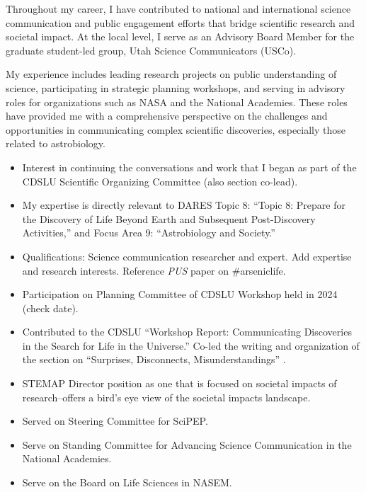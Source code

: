 \documentclass[12pt]{article}
\begin{document}
\vspace{1em}

Throughout my career, I have contributed to national and international science communication and public engagement efforts that bridge scientific research and societal impact. At the local level, I serve as an Advisory Board Member for the graduate student-led group, Utah Science Communicators (USCo).

My experience includes leading research projects on public understanding of science, participating in strategic planning workshops, and serving in advisory roles for organizations such as NASA and the National Academies. These roles have provided me with a comprehensive perspective on the challenges and opportunities in communicating complex scientific discoveries, especially those related to astrobiology.


\begin{itemize}
    \item Interest in continuing the conversations and work that I began as part of the CDSLU Scientific Organizing Committee (also section co-lead).
    \item My expertise is directly relevant to DARES Topic 8: “Topic 8: Prepare for the Discovery of Life Beyond Earth and Subsequent Post-Discovery Activities,” and Focus Area 9: “Astrobiology and Society.”
    \item Qualifications: Science communication researcher and expert. Add expertise and research interests. Reference \textit{PUS} paper on \#arseniclife.
    \item Participation on Planning Committee of CDSLU Workshop held in 2024 (check date).
    \item Contributed to the CDSLU ``Workshop Report: Communicating Discoveries in the Search for Life in the Universe.'' Co-led the writing and organization of the section on ``Surprises, Disconnects, Misunderstandings'' \parencite{bimmWorkshopReportCommunicatingforthcoming}.
    \item STEMAP Director position as one that is focused on societal impacts of research--offers a bird's eye view of the societal impacts landscape.
    \item Served on Steering Committee for SciPEP.
    \item Serve on Standing Committee for Advancing Science Communication in the National Academies.
    \item Serve on the Board on Life Sciences in NASEM.
\end{itemize}

\newpage

\printbibliography
\end{document}
